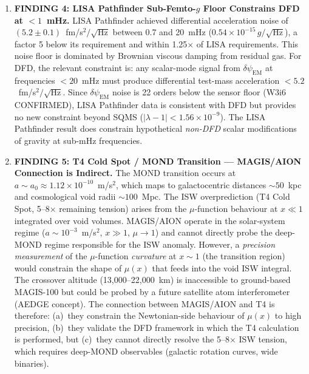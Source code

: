 \documentclass[11pt]{article}
\theoremstyle{definition}
\theoremstyle{remark}
\newcommand{\ee}[1]{\times10^{#1}}
\newcommand{\lambdaone}{|\lambda-1|}
\newcommand{\dpsiem}{\delta\psi_{\mathrm{EM}}}
\newcommand{\azero}{a_0}
\begin{document}
\begin{tcolorbox}[colback=blue!5!white, colframe=blue!60!black,
  title=\textbf{TOP 5 FINDINGS --- W4i10 P6}]
\begin{enumerate}[nosep]
\item \textbf{FINDING 4: LISA Pathfinder Sub-Femto-$g$ Floor Constrains
  DFD at $< 1$~mHz.}
  LISA Pathfinder achieved differential acceleration noise of
  $(5.2 \pm 0.1)$~fm/s$^2/\sqrt{\mathrm{Hz}}$ between 0.7 and 20~mHz
  ($0.54\ee{-15}\,g/\sqrt{\mathrm{Hz}}$), a factor 5 below its
  requirement and within 1.25$\times$ of LISA requirements. This noise
  floor is dominated by Brownian viscous damping from residual gas.
  For DFD, the relevant constraint is: any scalar-mode signal from
  $\dpsiem$ at frequencies $< 20$~mHz must produce differential test-mass
  acceleration $< 5.2$~fm/s$^2/\sqrt{\mathrm{Hz}}$. Since $\dpsiem$
  noise is 22 orders below the sensor floor (W3i6 CONFIRMED), LISA
  Pathfinder data is consistent with DFD but provides no new constraint
  beyond SQMS ($\lambdaone < 1.56\ee{-9}$). The LISA Pathfinder result
  does constrain hypothetical \emph{non-DFD} scalar modifications of
  gravity at sub-mHz frequencies.

\item \textbf{FINDING 5: T4 Cold Spot / MOND Transition --- MAGIS/AION
  Connection is Indirect.}
  The MOND transition occurs at $a \sim \azero \approx 1.12\ee{-10}$~m/s$^2$,
  which maps to galactocentric distances $\sim 50$~kpc and cosmological
  void radii $\sim 100$~Mpc. The ISW overprediction (T4 Cold Spot,
  5--8$\times$ remaining tension) arises from the $\mu$-function behaviour
  at $x \ll 1$ integrated over void volumes. MAGIS/AION operate in
  the solar-system regime ($a \sim 10^{-3}$~m/s$^2$, $x \gg 1$,
  $\mu \to 1$) and cannot directly probe the deep-MOND regime responsible
  for the ISW anomaly. However, a \emph{precision measurement} of the
  $\mu$-function \emph{curvature} at $x \sim 1$ (the transition region)
  would constrain the shape of $\mu(x)$ that feeds into the void ISW
  integral. The crossover altitude (13,000--22,000~km) is inaccessible
  to ground-based MAGIS-100 but could be probed by a future satellite
  atom interferometer (AEDGE concept). The connection between MAGIS/AION
  and T4 is therefore: (a)~they constrain the Newtonian-side behaviour
  of $\mu(x)$ to high precision, (b)~they validate the DFD framework
  in which the T4 calculation is performed, but (c)~they cannot
  directly resolve the 5--8$\times$ ISW tension, which requires
  deep-MOND observables (galactic rotation curves, wide binaries).
\end{enumerate}
\end{tcolorbox}

\end{document}
